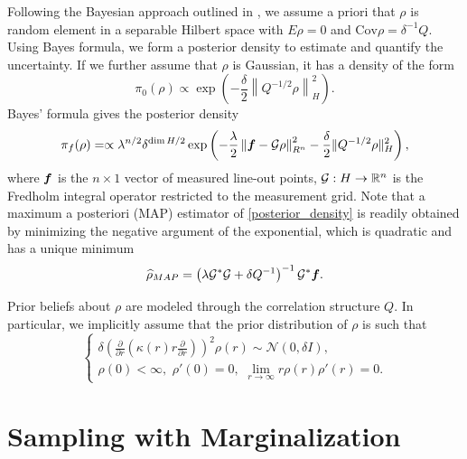 \documentclass{amsart}
\theoremstyle{plain}
\begin{document}
Following the Bayesian approach outlined in \cite{stuart2010}, we assume a priori that $\rho$ is random element in a separable Hilbert space with $E \rho = 0$ and $\mathrm{Cov} \rho = \delta^{-1}Q$.
Using Bayes formula, we form a posterior density to estimate  and quantify the uncertainty.
If we further assume that $\rho$ is Gaussian, it has a density of the form
\begin{equation}
  \pi_0(\rho) \propto \exp\left(-\frac {\delta}2 \left\|Q^{-1/2} \rho\right\|^2_H \right). 
  \label{prior_density}
\end{equation}
Bayes' formula gives the posterior density
\begin{equation}
  \pi_f(\rho) = \propto \lambda^{n/2} \delta^{\dim H /2}\exp\left( -\frac {\lambda}2 \left\| \boldsymbol{f} - \mathcal G \rho \right\|^2_{R^n} - \frac \delta2 \| Q^{-1/2} \rho \|^2_{H} \right),
  \label{posterior_density}
\end{equation}
where $\boldsymbol{f}$ is the $n\times 1$ vector of measured line-out points, $\mathcal G : H \to \mathbb R^n$ is the Fredholm integral operator restricted to the measurement grid.
Note that a maximum a posteriori (MAP) estimator of \eqref{posterior_density} is readily obtained by minimizing the negative argument of the exponential, which is quadratic and has a unique minimum
\begin{equation}
  \widehat \rho_{MAP} = \left( \lambda \mathcal G^* \mathcal G + \delta Q^{-1}\right)^{-1} \mathcal G^* \boldsymbol{f}.
  \label{map_estimate}
\end{equation}

Prior beliefs about $\rho$ are modeled through the correlation structure $Q$. In particular, we implicitly assume that the prior distribution of $\rho$ is such that 
\begin{equation}
  \begin{cases}
    \displaystyle{\delta \left( \frac{\partial}{\partial r} \left(\kappa(r)r \frac{\partial}{\partial r}\right)\right)^2 \rho(r) \sim \mathcal N (0,\delta I),}\\
    \displaystyle{\rho(0) < \infty,\,\,\rho'(0) = 0,\,\,\lim_{r\to\infty}r\rho(r)\rho'(r) = 0.}
  \end{cases}
  \label{biharmonic_prior}
\end{equation}

\section{Sampling with Marginalization}
\end{document}
